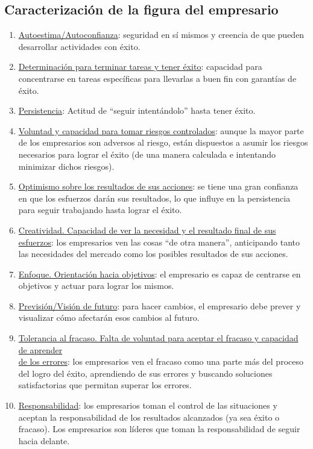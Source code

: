 \documentclass[12pt]{article}
\theoremstyle{definition_wo_parentheses}
\begin{document}
\subsection{Caracterización de la figura del empresario}
\begin{enumerate}
\item \underline{Autoestima/Autoconfianza}: seguridad en sí mismos y creencia de que pueden desarrollar actividades con éxito.
\item \underline{Determinación para terminar tareas y tener éxito}: capacidad para concentrarse en tareas específicas para llevarlas a buen fin con garantías de éxito.
\item \underline{Persistencia}: Actitud de ``seguir intentándolo'' hasta tener éxito.
\item \underline{Voluntad y capacidad para tomar riesgos controlados}: aunque la mayor parte de los empresarios son adversos al riesgo, están dispuestos a asumir los riesgos necesarios para lograr el éxito (de una manera calculada e intentando minimizar dichos riesgos).
\item \underline{Optimismo sobre los resultados de sus acciones}: se tiene una gran confianza en que los esfuerzos darán sus resultados, lo que influye en la persistencia para seguir trabajando hasta lograr el éxito.
\item \underline{Creatividad. Capacidad de ver la necesidad y el resultado final de sus esfuerzos}: los empresarios ven las cosas ``de otra manera'', anticipando tanto las necesidades del mercado como los posibles resultados de sus acciones.
\item \underline{Enfoque. Orientación hacia objetivos}: el empresario es capaz de centrarse en objetivos y actuar para lograr los mismos.
\item \underline{Previsión/Visión de futuro}: para hacer cambios, el empresario debe prever y visualizar cómo afectarán esos cambios al futuro.
\item \underline{Tolerancia al fracaso. Falta de voluntad para aceptar el fracaso y capacidad de aprender}\\ \underline{de los errores}: los empresarios ven el fracaso como una parte más del proceso del logro del éxito, aprendiendo de sus errores y buscando soluciones satisfactorias que permitan superar los errores.
\item \underline{Responsabilidad}: los empresarios toman el control de las situaciones y aceptan la responsabilidad de los resultados alcanzados (ya sea éxito o fracaso). Los empresarios son líderes que toman la responsabilidad de seguir hacia delante.
\end{enumerate}
\end{document}
